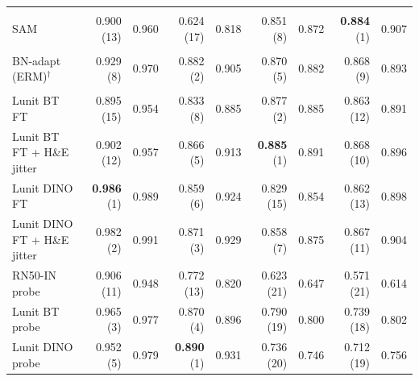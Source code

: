 \begin{tabular*}{\tblwidth}{@{\extracolsep{\fill}}l*{4}{rr}@{}}
\addlinespace[2pt]
\multicolumn{9}{@{}l}{\emph{Sharpness-aware}}\\
SAM & 0.900 (13) & 0.960 & 0.624 (17) & 0.818 & 0.851 (8) & 0.872 & \textbf{0.884} (1) & 0.907 \\
\addlinespace[2pt]
\multicolumn{9}{@{}l}{\emph{Test-time adaptation}}\\
BN-adapt (ERM)$^{\dagger}$ & 0.929 (8) & 0.970 & 0.882 (2) & 0.905 & 0.870 (5) & 0.882 & 0.868 (9) & 0.893 \\
\addlinespace[2pt]
\multicolumn{9}{@{}l}{\emph{Pretrained representations}}\\
Lunit BT FT & 0.895 (15) & 0.954 & 0.833 (8) & 0.885 & 0.877 (2) & 0.885 & 0.863 (12) & 0.891 \\
Lunit BT FT + H\&E jitter & 0.902 (12) & 0.957 & 0.866 (5) & 0.913 & \textbf{0.885} (1) & 0.891 & 0.868 (10) & 0.896 \\
Lunit DINO FT & \textbf{0.986} (1) & 0.989 & 0.859 (6) & 0.924 & 0.829 (15) & 0.854 & 0.862 (13) & 0.898 \\
Lunit DINO FT + H\&E jitter & 0.982 (2) & 0.991 & 0.871 (3) & 0.929 & 0.858 (7) & 0.875 & 0.867 (11) & 0.904 \\
RN50-IN probe & 0.906 (11) & 0.948 & 0.772 (13) & 0.820 & 0.623 (21) & 0.647 & 0.571 (21) & 0.614 \\
Lunit BT probe & 0.965 (3) & 0.977 & 0.870 (4) & 0.896 & 0.790 (19) & 0.800 & 0.739 (18) & 0.802 \\
Lunit DINO probe & 0.952 (5) & 0.979 & \textbf{0.890} (1) & 0.931 & 0.736 (20) & 0.746 & 0.712 (19) & 0.756 \\
\bottomrule
\end{tabular*}
